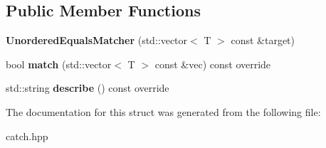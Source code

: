 \subsection*{Public Member Functions}
\begin{DoxyCompactItemize}
\item 
{\bfseries Unordered\+Equals\+Matcher} (std\+::vector$<$ T $>$ const \&target)\hypertarget{structCatch_1_1Matchers_1_1Vector_1_1UnorderedEqualsMatcher_a525905639b2b15b52ddb0bf14bfa19da}{}\label{structCatch_1_1Matchers_1_1Vector_1_1UnorderedEqualsMatcher_a525905639b2b15b52ddb0bf14bfa19da}

\item 
bool {\bfseries match} (std\+::vector$<$ T $>$ const \&vec) const override\hypertarget{structCatch_1_1Matchers_1_1Vector_1_1UnorderedEqualsMatcher_a3ccdd9dd2cd8bdbb8bb121acbb9cb358}{}\label{structCatch_1_1Matchers_1_1Vector_1_1UnorderedEqualsMatcher_a3ccdd9dd2cd8bdbb8bb121acbb9cb358}

\item 
std\+::string {\bfseries describe} () const override\hypertarget{structCatch_1_1Matchers_1_1Vector_1_1UnorderedEqualsMatcher_a7202d811200317abc58c844f663823df}{}\label{structCatch_1_1Matchers_1_1Vector_1_1UnorderedEqualsMatcher_a7202d811200317abc58c844f663823df}

\end{DoxyCompactItemize}


The documentation for this struct was generated from the following file\+:\begin{DoxyCompactItemize}
\item 
catch.\+hpp\end{DoxyCompactItemize}
